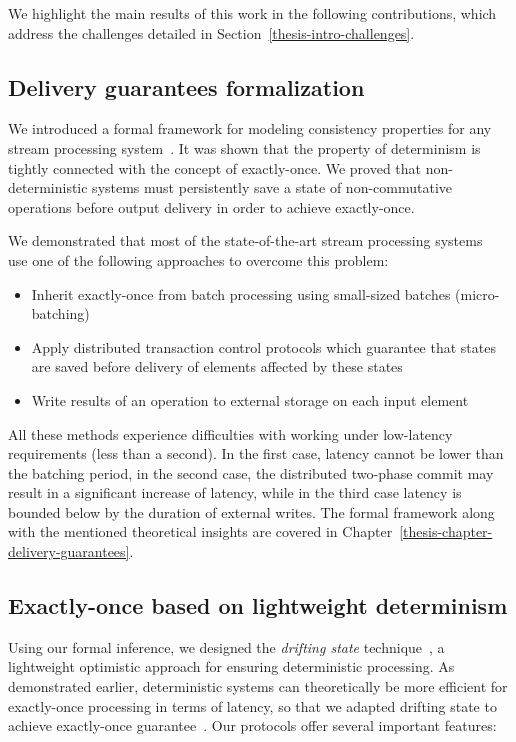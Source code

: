 We highlight the main results of this work in the following contributions, which address the challenges detailed in Section~\ref{thesis-intro-challenges}.

\subsection{Delivery guarantees formalization}

We introduced a formal framework for modeling consistency properties for any stream processing system~\cite{thepaper}. It was shown that the property of determinism is tightly connected with the concept of exactly-once. We proved that non-deterministic systems must persistently save a state of non-commutative operations before output delivery in order to achieve exactly-once.

We demonstrated that most of the state-of-the-art stream processing systems~\cite{Carbone:2017:SMA:3137765.3137777, Zaharia:2012:DSE:2342763.2342773, Akidau:2013:MFS:2536222.2536229, apache:storm:trident} use one of the following approaches to overcome this problem: 

\begin{itemize}
    \item Inherit exactly-once from batch processing using small-sized batches (micro-batching)
    \item Apply distributed transaction control protocols which guarantee that states are saved before delivery of elements affected by these states
    \item Write results of an operation to external storage on each input element
\end{itemize}

All these methods experience difficulties with working under low-latency requirements (less than a second). In the first case, latency cannot be lower than the batching period, in the second case, the distributed two-phase commit may result in a significant increase of latency, while in the third case latency is bounded below by the duration of external writes. The formal framework along with the mentioned theoretical insights are covered in Chapter~\ref{thesis-chapter-delivery-guarantees}.

\subsection{Exactly-once based on lightweight determinism}

Using our formal inference, we designed the \textit{drifting state} technique~\cite{we2018adbis}, a lightweight optimistic approach for ensuring deterministic processing. As demonstrated earlier, deterministic systems can theoretically be more efficient for exactly-once processing in terms of latency, so that we adapted drifting state to achieve exactly-once guarantee~\cite{thepaper}. Our protocols offer several important features:

